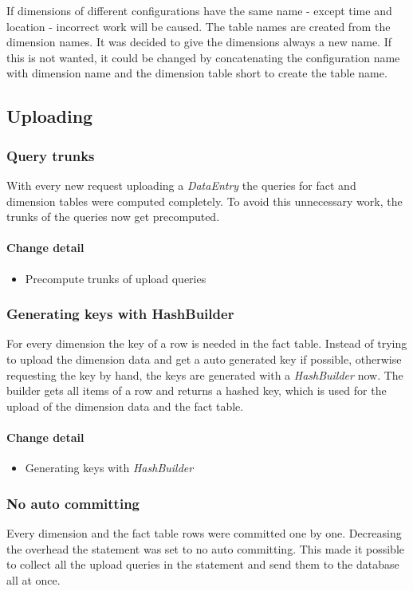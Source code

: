 If dimensions of different configurations have the same name - except time and location - 
incorrect work will be caused. The table names are created from the dimension names.
It was decided to give the dimensions always a new name. If this is
not wanted, it could be changed by concatenating
the configuration name with dimension name and the dimension table short
to create the table name.

\subsection{Uploading}
\subsubsection{Query trunks}
With every new request uploading a \textit{DataEntry} the queries 
for fact and dimension tables were computed completely. To avoid
this unnecessary work, the trunks of the queries now get precomputed.

\paragraph{Change detail}
\begin{itemize}
  \item Precompute trunks of upload queries
\end{itemize}


\subsubsection{Generating keys with HashBuilder}
For every dimension the key of a row is needed in the fact table.
Instead of trying to upload the dimension data and get a auto generated key if possible,
otherwise requesting the key by hand, the keys are generated with a
\textit{HashBuilder} now. The builder gets all items of a row and
returns a hashed key, which is used for the upload of the dimension data
and the fact table.

\paragraph{Change detail}
\begin{itemize}
  \item Generating keys with \textit{HashBuilder}
\end{itemize}


\subsubsection{No auto committing}\label{noAu}
Every dimension and the fact table rows were committed one by one. Decreasing
the overhead the statement was set to no auto committing. This made it possible
to collect all the upload queries in the statement and send them to the database
all at once.

